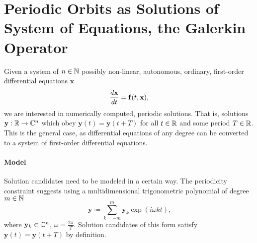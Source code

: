 \section{Periodic Orbits as Solutions of System of Equations, the Galerkin Operator}

Given a system of $n \in \mathbb{N}$ possibly non-linear, autonomous, ordinary, first-order differential equations $\mathbf{x}$
	\begin{equation} \label{eq:SDE}
		\frac{d\mathbf{x}}{dt} = \mathbf{f}(t, \mathbf{x}) \text,
	\end{equation}
we are interested in numerically computed, periodic solutions.
That is, solutions $\mathbf{y}: \mathbb{R} \to \mathbb{C}^n$ which obey $\mathbf{y}(t) = \mathbf{y}(t+T)$ for all $t \in \mathbb{R}$ and some period $T \in \mathbb{R}$.
This is the general case, as differential equations of any degree can be converted to a system of first-order differential equations.

\paragraph{Model} Solution candidates need to be modeled in a certain way.
The periodicity constraint suggests using a multidimensional trigonometric polynomial of degree $m \in \mathbb{N}$
	\[
		\mathbf{y} \coloneqq \sum_{k = -m}^m \mathbf{y}_k \exp\left(i \omega k t\right) \text{,}
	\]
where $\mathbf{y}_k \in \mathbb{C}^n$, $\omega = \frac{2\pi}T$. %
Solution candidates of this form satisfy $\mathbf{y}(t) = \mathbf{y}(t+T)$ by definition.

